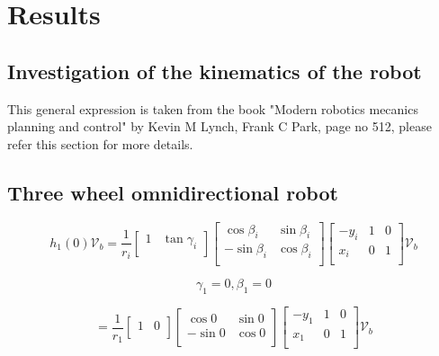 \documentclass[12pt, twoside]{report}
\begin{document}

\chapter{Results}

\section{Investigation of the kinematics of the robot}

This general expression is taken from the book
"Modern robotics mecanics planning and control" by Kevin M Lynch, Frank C Park,
page no 512, please refer this section for more details.

\section{Three wheel omnidirectional robot}


\begin{equation}
    h_1(0) \mathcal{V}_b = \frac{1}{r_i} \left[\begin{array}{cc}
            1 & \tan\gamma_i \\
        \end{array}\right]
    \left[\begin{array}{cc}
            \cos \beta_i  & \sin \beta_i \\
            -\sin \beta_i & \cos \beta_i \\
        \end{array}\right]
    \begin{bmatrix}
        -y_i & 1 & 0 \\
        x_i  & 0 & 1 \\
    \end{bmatrix} \mathcal{V}_b
\end{equation}

\begin{equation*}
    \gamma_1 = 0, \beta_1 = 0
\end{equation*}

\begin{equation}
    = \frac{1}{r_1} \left[\begin{array}{cc}
            1 & 0 \\
        \end{array}\right]
    \left[\begin{array}{cc}
            \cos 0  & \sin 0 \\
            -\sin 0 & \cos 0 \\
        \end{array}\right]
    \begin{bmatrix}
        -y_1 & 1 & 0 \\
        x_1  & 0 & 1 \\
    \end{bmatrix}
    \mathcal{V}_b
\end{equation}
\end{document}
